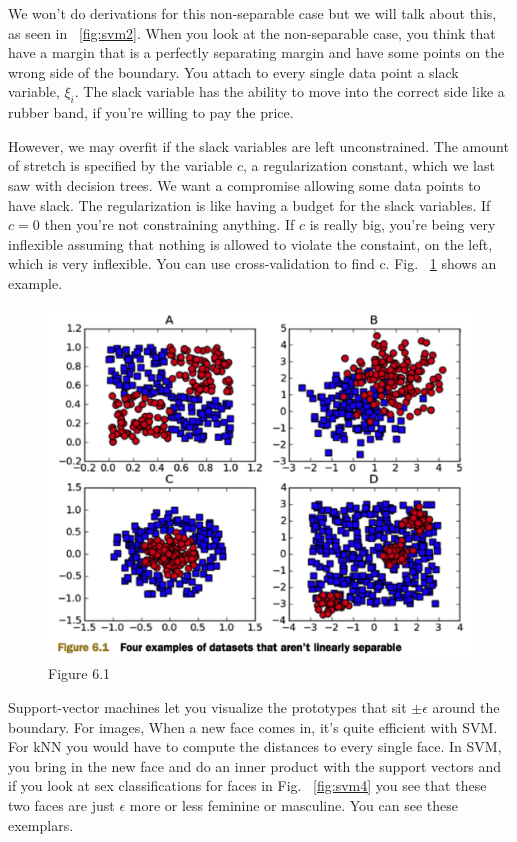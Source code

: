 \documentclass[a4paper]{article}
\begin{document}
We won't do derivations for this non-separable case but we will talk about this, as seen in ~\ref{fig:svm2}.  When you look at the non-separable case, you think that have a margin that is a perfectly separating margin and have some points on the wrong side of the boundary.  You attach to every single data point a slack variable, $\xi_i$.  The slack variable has the ability to move into the correct side like a rubber band, if you're willing to pay the price.

However, we may overfit if the slack variables are left unconstrained.  The amount of stretch is specified by the variable $c$, a regularization constant, which we last saw with decision trees.  We want a compromise allowing some data points to have slack.  The regularization is like having a budget for the slack variables.  If $c=0$ then you're not constraining anything.  If $c$ is really big, you're being very inflexible assuming that nothing is allowed to violate the constaint, on the left, which is very inflexible.  You can use cross-validation to find c.  Fig. ~\ref{fig:svm3} shows an example.

\begin{figure}
\centering
\includegraphics[width=1.0\textwidth]{fig6_1.png}
\caption{\label{fig:svm3}Figure 6.1}
\end{figure}

Support-vector machines let you visualize the prototypes that sit $\pm \epsilon$ around the boundary.  For images, When a new face comes in, it's quite efficient with SVM.  For kNN you would have to compute the distances to every single face.  In SVM, you bring in the new face and do an inner product with the support vectors and if you look at sex classifications for faces in Fig. ~\ref{fig:svm4} you see that these two faces are just $\epsilon$ more or less feminine or masculine.  You can see these exemplars.
\end{document}
